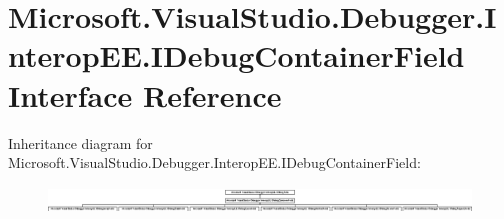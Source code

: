 \hypertarget{interface_microsoft_1_1_visual_studio_1_1_debugger_1_1_interop_e_e_1_1_i_debug_container_field}{\section{Microsoft.\+Visual\+Studio.\+Debugger.\+Interop\+E\+E.\+I\+Debug\+Container\+Field Interface Reference}
\label{interface_microsoft_1_1_visual_studio_1_1_debugger_1_1_interop_e_e_1_1_i_debug_container_field}
}
Inheritance diagram for Microsoft.\+Visual\+Studio.\+Debugger.\+Interop\+E\+E.\+I\+Debug\+Container\+Field\+:\begin{figure}[H]
\begin{center}
\leavevmode
\includegraphics[height=0.712468cm]{interface_microsoft_1_1_visual_studio_1_1_debugger_1_1_interop_e_e_1_1_i_debug_container_field}
\end{center}
\end{figure}
